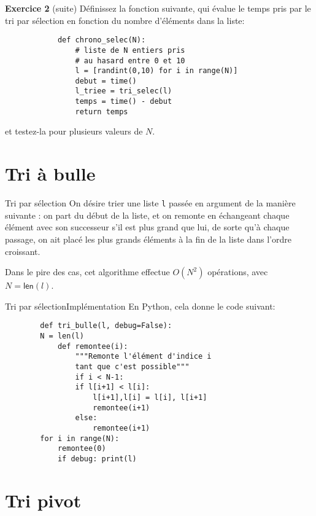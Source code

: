 \begin{frame}[fragile]
	\begin{block}{\textbf{Exercice 2} (suite)}
		Définissez la fonction suivante, qui évalue le temps pris par le tri par sélection en fonction du nombre d'éléments dans la liste:
		\begin{lstlisting}
			def chrono_selec(N):
				# liste de N entiers pris
				# au hasard entre 0 et 10
				l = [randint(0,10) for i in range(N)]
				debut = time()
				l_triee = tri_selec(l)
				temps = time() - debut
				return temps
		\end{lstlisting}
		et testez-la pour plusieurs valeurs de $N$.
	\end{block}
\end{frame}


\section{Tri à bulle}

\begin{frame}[fragile]{Tri par sélection}
	On désire trier une liste \lstinline|l| passée en argument de la manière suivante : on part du début de la liste, et on remonte en échangeant chaque élément avec son successeur s'il est plus grand que lui, de sorte qu'à chaque passage, on ait placé les plus grands éléments à la fin de la liste dans l'ordre croissant.
	
	Dans le pire des cas, cet algorithme effectue $O(N^2)$ opérations, avec $N = \mathsf{len}(l)$.
\end{frame}


\begin{frame}[fragile]{Tri par sélection}{Implémentation}
	En Python, cela donne le code suivant:
	\begin{lstlisting}
		def tri_bulle(l, debug=False):
		N = len(l)
			def remontee(i):
				"""Remonte l'élément d'indice i
				tant que c'est possible"""
				if i < N-1:
				if l[i+1] < l[i]:
					l[i+1],l[i] = l[i], l[i+1]
					remontee(i+1)
				else:
					remontee(i+1)
		for i in range(N):
			remontee(0)
			if debug: print(l)
	\end{lstlisting}
\end{frame}

\section{Tri pivot}



